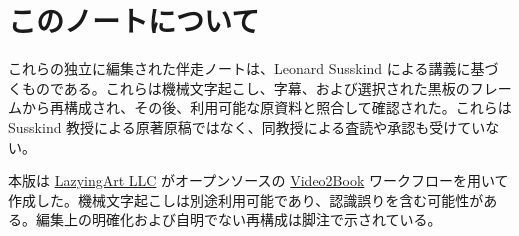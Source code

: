 \documentclass[11pt,oneside]{book}
\begin{document}
\frontmatter
\hypersetup{pageanchor=false}

\hypersetup{pageanchor=true}

\clearpage
\chapter*{このノートについて}
これらの独立に編集された伴走ノートは、Leonard Susskind による講義に基づくものである。これらは機械文字起こし、字幕、および選択された黒板のフレームから再構成され、その後、利用可能な原資料と照合して確認された。これらは Susskind 教授による原著原稿ではなく、同教授による査読や承認も受けていない。

本版は \href{https://lazying.art}{LazyingArt LLC} がオープンソースの \href{https://github.com/lachlanchen/Video2Book}{Video2Book} ワークフローを用いて作成した。機械文字起こしは別途利用可能であり、認識誤りを含む可能性がある。編集上の明確化および自明でない再構成は脚注で示されている。
\clearpage
\tableofcontents
\mainmatter










\end{document}
